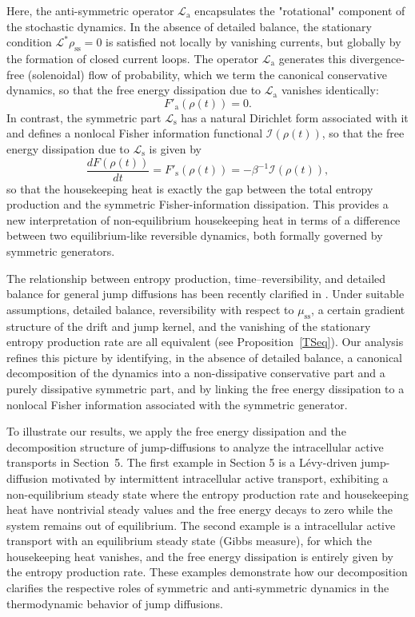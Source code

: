 \documentclass[10pt]{article}
\theoremstyle{definition}
\numberwithin{equation}{section}
\begin{document}
Here, the anti-symmetric operator $\mathcal{L}_\mathrm{a}$ encapsulates the "rotational" component of the stochastic dynamics. 
In the absence of detailed balance, the stationary condition $\mathcal{L}^*\rho_\mathrm{ss}=0$ is satisfied not locally by vanishing currents, but globally by the formation of closed current loops.
The operator $\mathcal{L}_\mathrm{a}$ generates this divergence-free (solenoidal) flow of probability, which we term the canonical conservative dynamics, so that the  free energy dissipation due to $\mathcal{L}_\mathrm{a}$ vanishes identically:
\[
F'_\mathrm{a}(\rho(t)) = 0.
\]
In contrast, the symmetric part $\mathcal{L}_\mathrm{s}$ has a natural Dirichlet form associated with it and defines a nonlocal Fisher information functional $\mathcal{I}(\rho(t))$, so that the free energy dissipation due to $\mathcal{L}_\mathrm{s}$ is given by
\[
\frac{dF(\rho(t))}{dt}
= F'_\mathrm{s}(\rho(t))
= -\beta^{-1}\mathcal{I}(\rho(t)),
\]
so that the housekeeping heat is exactly the gap between the total entropy production and the symmetric Fisher-information dissipation. 
This provides a new interpretation of non-equilibrium housekeeping heat in terms of a difference between two equilibrium-like reversible dynamics, both formally governed by symmetric generators.

The relationship between entropy production, time–reversibility, and detailed balance for general jump diffusions has been recently clarified in \cite{ZL25}. 
Under suitable assumptions, detailed balance, reversibility with respect to $\mu_\mathrm{ss}$, a certain gradient structure of the drift and jump kernel, and the vanishing of the stationary entropy production rate are all equivalent (see Proposition~\ref{TSeq}). 
Our analysis refines this picture by identifying, in the absence of detailed balance, a canonical decomposition of the dynamics into a non-dissipative conservative part and a purely dissipative symmetric part, and by linking the free energy dissipation to a nonlocal Fisher information associated with the symmetric generator.


To illustrate our results, we apply the free energy dissipation and the decomposition structure of jump-diffusions to analyze the intracellular active transports in Section~5. 
The first example in Section 5 is a L\'evy-driven jump-diffusion motivated by intermittent intracellular active transport, exhibiting a non-equilibrium steady state where the entropy production rate and housekeeping heat have nontrivial steady values and the free energy decays to zero while the system remains out of equilibrium. The second example is a intracellular active transport with an equilibrium steady state (Gibbs measure), for which the housekeeping heat vanishes, and the free energy dissipation is entirely given by the entropy production rate. 
These examples demonstrate how our decomposition clarifies the respective roles of symmetric and anti-symmetric dynamics in the thermodynamic behavior of jump diffusions.
\end{document}
